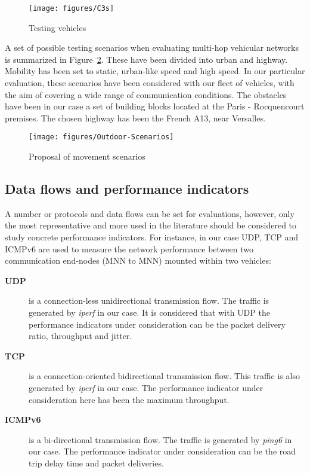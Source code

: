 \documentclass[fonts]{icst}
\begin{document}
\begin{figure}[htbp]
   \begin{center}
    \texttt{[image: figures/C3s]}
      \caption{Testing vehicles}
      \label{fig:Prototype-vehicles-used}
  \end{center}
\end{figure}

A set of possible testing scenarios when evaluating multi-hop vehicular networks is summarized in Figure~\ref{fig:scenarios}. These have been divided
into urban and highway. Mobility has been set to static, urban-like speed and
high speed. In our particular evaluation, these scenarios have been considered with our fleet of vehicles, with the aim of covering a wide range of communication conditions. The obstacles have been in our case a set of building blocks located at the Paris - Rocquencourt premises. The chosen highway has been the French
A13, near Versalles.

\begin{figure}[htbp]
   \begin{center}
    \texttt{[image: figures/Outdoor-Scenarios]}
      \caption{Proposal of movement scenarios}
      \label{fig:scenarios}
  \end{center}
\end{figure}

\subsection{Data flows and performance indicators}

A number or protocols and data flows can be set for evaluations, however, only
the most representative and more used in the literature should be considered to
study concrete performance indicators. For instance, in our case UDP, TCP and
ICMPv6 are used to measure the network performance between two communication
end-nodes (MNN to MNN) mounted within two vehicles:

\begin{description}

\item [\bf UDP] is a connection-less unidirectional transmission flow. The
      traffic is generated by \textit{iperf} in our case. It is considered that with UDP the performance indicators under consideration can be the packet delivery ratio, throughput and jitter.
      
\item [\bf TCP] is a connection-oriented bidirectional transmission flow. This
      traffic is also generated by \textit{iperf} in our case. The performance indicator under consideration here has been the maximum throughput.
      
\item [\bf ICMPv6] is a bi-directional transmission flow. The traffic is
      generated by \textit{ping6} in our case. The performance indicator under
      consideration can be the road trip delay time and packet deliveries.

\end{description}
\end{document}
